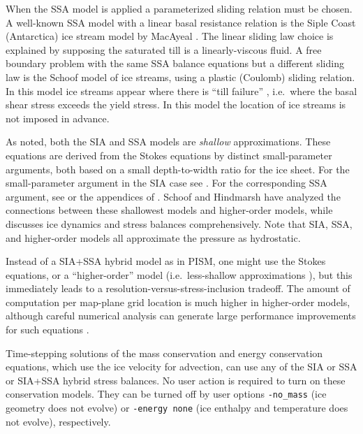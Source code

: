 When the SSA model is applied a parameterized sliding relation must be chosen.  A well-known SSA model with a linear basal resistance relation is the Siple Coast (Antarctica) ice stream model by MacAyeal \cite{MacAyeal}.  The linear sliding law choice is explained by supposing the saturated till is a linearly-viscous fluid.  A free boundary problem with the same SSA balance equations but a different sliding law is the Schoof \cite{SchoofStream} model of ice streams, using a plastic (Coulomb) sliding relation.  In this model ice streams appear where there is ``till failure'' \cite{Paterson}, i.e.~where the basal shear stress exceeds the yield stress.  In this model the location of ice streams is not imposed in advance.

As noted, both the SIA and SSA models are \emph{shallow} approximations.  These equations are derived from the Stokes equations by distinct small-parameter arguments, both based on a small depth-to-width ratio for the ice sheet.  For the small-parameter argument in the SIA case see \cite{Fowler}.  For the corresponding SSA argument, see \cite{WeisGreveHutter} or the appendices of \cite{SchoofStream}.  Schoof and Hindmarsh \cite{SchoofHindmarsh} have analyzed the connections between these shallowest models and higher-order models, while \cite{GreveBlatter2009} discusses ice dynamics and stress balances comprehensively.  Note that SIA, SSA, and higher-order models all approximate the pressure as hydrostatic.

Instead of a SIA+SSA hybrid model as in PISM, one might use the Stokes equations, or a ``higher-order'' model (i.e.~less-shallow approximations \cite{Blatter,Pattyn03}), but this immediately leads to a resolution-versus-stress-inclusion tradeoff.  The amount of computation per map-plane grid location is much higher in higher-order models, although careful numerical analysis can generate large performance improvements for such equations \cite{BrownSmithAhmadia2013}.

Time-stepping solutions of the mass conservation and energy conservation equations, which use the ice velocity for advection, can use any of the SIA or SSA or SIA+SSA hybrid stress balances.  No user action is required to turn on these conservation models.  They can be turned off by user options \texttt{-no_mass} (ice geometry does not evolve) or \texttt{-energy none} (ice enthalpy and temperature does not evolve), respectively.

\newenvironment{tightlist}{\begin{itemize}  \vspace{-0.15in}\addtolength{\itemsep}{-0.5\baselineskip} } {\vspace{-0.1in} \end{itemize}}

